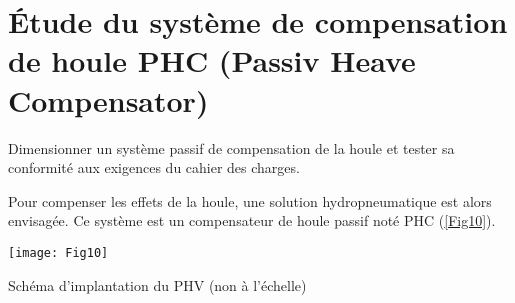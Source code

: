 % 
%
%
% 
%
%

\section*{Étude du système de compensation de houle PHC (Passiv Heave
Compensator)}
\begin{obj}
Dimensionner un système passif de compensation de la houle et tester sa conformité aux exigences du
cahier des charges.
\end{obj}

\ifprof
\else
Pour compenser les effets de la houle, une solution hydropneumatique est alors envisagée. Ce système est un
compensateur de houle passif noté PHC (\autoref{Fig10}).\\


\begin{marginfigure}
\centering
\texttt{[image: Fig10]}
\caption{ Schéma d’implantation du PHV (non à l’échelle)}
\label{Fig10}
\end{marginfigure}





